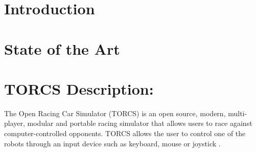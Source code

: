 \documentclass[runningheads,a4paper]{llncs}
\begin{document}
	\section{Introduction}
	\label{sec:intro}


	\section{State of the Art}
	\label{sec:soa}
\section{ TORCS Description: }
	\label{sec:torcs}
The Open Racing Car Simulator (TORCS) is an open source, modern, multi-player, modular and portable racing simulator that allows users to race against computer-controlled opponents. TORCS allows the user to control one of the robots through an input device such as keyboard, mouse or joystick \cite{8}.
\end{document}
